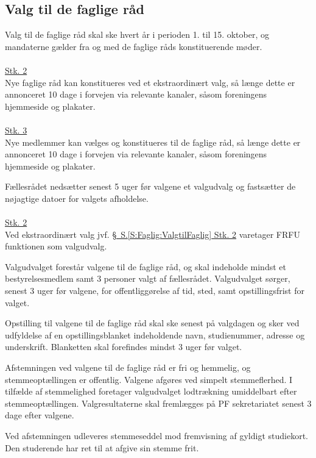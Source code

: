 \begin{list}
\subsection{Valg til de faglige råd}
\label{S:kap:valgtilfagligraad}
\item \label{S:Faglig:ValgtilFaglig} Valg til de faglige råd skal ske hvert år i perioden 1. til 15. oktober, og mandaterne gælder fra og med de faglige råds konstituerende møder.\\
\\
\underline{Stk. 2} \\
Nye faglige råd kan konstitueres ved et ekstraordinært valg, så længe dette er annonceret 10 dage i forvejen via relevante kanaler, såsom foreningens hjemmeside og plakater.\\
\\
\underline{Stk. 3} \\
Nye medlemmer kan vælges og konstitueres til de faglige råd, så længe dette er annonceret 10 dage i forvejen via relevante kanaler, såsom foreningens hjemmeside og plakater.\\

\item \label{S:Faglig:Valgudvalg} Fællesrådet nedsætter senest 5 uger før valgene et valgudvalg og fastsætter de nøjagtige datoer for valgets afholdelse.\\
\\
\underline{Stk. 2}\\
Ved ekstraordinært valg jvf. \hyperref[S:Faglig:ValgtilFaglig]{\S \ S.\ref*{S:Faglig:ValgtilFaglig} Stk. 2} varetager FRFU funktionen som valgudvalg.\\

\item Valgudvalget forestår valgene til de faglige råd, og skal indeholde mindst et bestyrelsesmedlem samt 3 personer valgt af fællesrådet. Valgudvalget sørger, senest 3 uger før valgene, for offentliggørelse af tid, sted, samt opstillingsfrist for valget.

\item \label{S:Faglig:Blanket} Opstilling til valgene til de faglige råd skal ske senest på valgdagen og sker ved udfyldelse af en opstillingsblanket indeholdende navn, studienummer, adresse og underskrift. Blanketten skal forefindes mindst 3 uger før valget.

\item Afstemningen ved valgene til de faglige råd er fri og hemmelig, og stemmeoptællingen er offentlig. Valgene afgøres ved simpelt stemmeflerhed. I tilfælde af stemmelighed foretager valgudvalget lodtrækning umiddelbart efter stemmeoptællingen. Valgresultaterne skal fremlægges på PF sekretariatet senest 3 dage efter valgene.
\item Ved afstemningen udleveres stemmeseddel mod fremvisning af gyldigt studiekort. Den studerende har ret til at afgive sin stemme frit.


\end{list}
